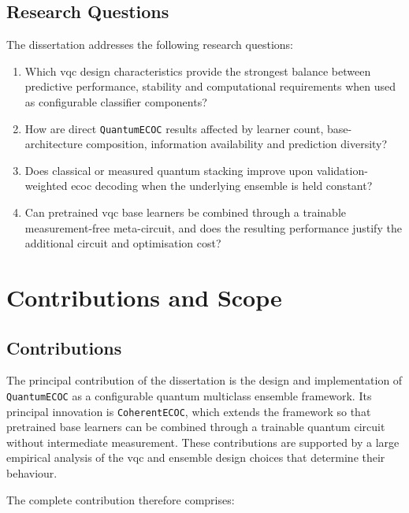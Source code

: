 \documentclass[]{UCD_CS_MSc_AAI_Report}
\begin{document}
\subsection{Research Questions}

The dissertation addresses the following research questions:

\begin{enumerate}
    \item Which \ac{vqc} design characteristics provide the strongest balance between predictive performance, stability and computational requirements when used as configurable classifier components?
    \item How are direct \texttt{QuantumECOC} results affected by learner count, base-architecture composition, information availability and prediction diversity?
    \item Does classical or measured quantum stacking improve upon validation-weighted \ac{ecoc} decoding when the underlying ensemble is held constant?
    \item Can pretrained \ac{vqc} base learners be combined through a trainable measurement-free meta-circuit, and does the resulting performance justify the additional circuit and optimisation cost?
\end{enumerate}

\section{Contributions and Scope}
\label{sec:intro-contributions-scope}

\subsection{Contributions}

The principal contribution of the dissertation is the design and implementation of \texttt{QuantumECOC} as a configurable quantum multiclass ensemble framework. Its principal innovation is \texttt{CoherentECOC}, which extends the framework so that pretrained base learners can be combined through a trainable quantum circuit without intermediate measurement. These contributions are supported by a large empirical analysis of the \ac{vqc} and ensemble design choices that determine their behaviour.

The complete contribution therefore comprises:
\end{document}
